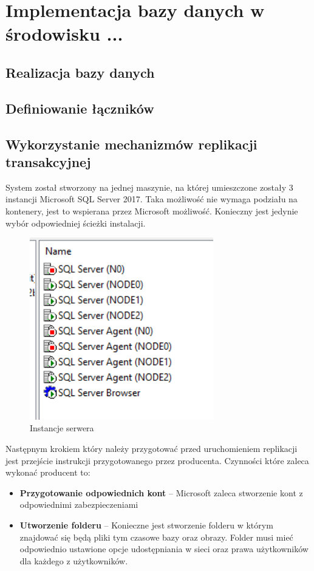 \documentclass{article}
\begin{document}
\section{Implementacja bazy danych w środowisku ...}
	\subsection{Realizacja bazy danych}
	\newpage
	\subsection{Definiowanie łączników}
	\newpage
	\subsection{Wykorzystanie mechanizmów replikacji transakcyjnej}
System został stworzony na jednej maszynie, na której umieszczone zostały 3 instancji Microsoft SQL Server 2017. Taka możliwość nie wymaga podziału na kontenery, jest to wspierana przez Microsoft możliwość. Konieczny jest jedynie wybór odpowiedniej ścieżki instalacji.
	
	\begin{figure}[hbt!]
		\includegraphics[width=8cm]{Files/Pictures/instancje}
		\centering
		\caption{Instancje serwera}
	\end{figure}
	

	
	Następnym krokiem który należy przygotować przed uruchomieniem replikacji jest przejście instrukcji przygotowanego przez producenta. Czynności które zaleca wykonać producent to:
	
	\begin{itemize}
	\item	\textbf{Przygotowanie odpowiednich kont} – Microsoft zaleca stworzenie kont z odpowiednimi zabezpieczeniami
	\item	\textbf{Utworzenie folderu} – Konieczne jest stworzenie folderu w którym znajdować się będą 	pliki tym czasowe bazy oraz obrazy. Folder musi mieć odpowiednio ustawione opcje udostępniania w sieci oraz prawa użytkowników dla każdego z użytkowników.
	\end{itemize}
	
\end{document}
